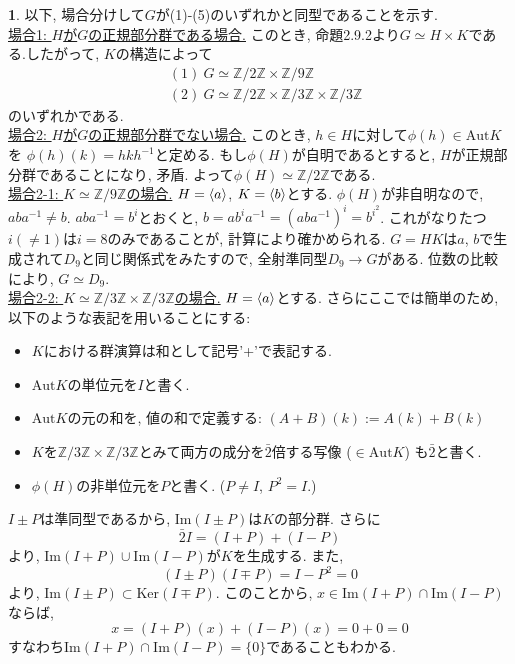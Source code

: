 \documentclass{article}
\theoremstyle{definition}
\newtheorem{ans}{}
\numberwithin{ans}{subsection}
\newcommand{\Z}[1]{\mathbb{Z}/#1\mathbb{Z}}
\newcommand{\Ker}[1]{\mathrm{Ker}(#1)}
\DeclarePairedDelimiter{\gen}{\langle}{\rangle}
\begin{document}
\begin{ans}
  以下, 場合分けして$G$が(1)-(5)のいずれかと同型であることを示す.\\

  \underline{場合1: $H$が$G$の正規部分群である場合.}
  このとき, 命題2.9.2より$G \simeq H \times K$である.したがって,
  $K$の構造によって
  \begin{align*}
    &(1)\ G \simeq \Z{2} \times \Z{9}\\
    &(2)\ G \simeq \Z{2} \times \Z{3} \times \Z{3}
  \end{align*}
  のいずれかである.\\

  \underline{場合2: $H$が$G$の正規部分群でない場合.}
  このとき, $h \in H$に対して$\phi(h) \in \mathrm{Aut}K$を
  $\phi(h)(k) = hkh^{-1}$と定める.
  もし$\phi(H)$が自明であるとすると, $H$が正規部分群であることになり, 矛盾.
  よって$\phi(H) \simeq \Z{2}$である.\\

  \underline{場合2-1: $K \simeq \Z{9}$の場合.}
  $H = \gen{a}$, $K = \gen{b}$とする.
  $\phi(H)$が非自明なので, $aba^{-1} \neq b$.
  $aba^{-1} = b^i$とおくと,
  $b = ab^ia^{-1} = (aba^{-1})^i = b^{i^2}$.
  これがなりたつ$i (\neq 1)$は$i = 8$のみであることが, 計算により確かめられる.
  $G = HK$は$a$, $b$で生成されて$D_9$と同じ関係式をみたすので,
  全射準同型$D_9 \rightarrow G$がある. 位数の比較により, $G \simeq D_9$.\\

  \underline{場合2-2: $K \simeq \Z{3} \times \Z{3}$の場合.}
  $H = \gen{a}$とする.
  さらにここでは簡単のため, 以下のような表記を用いることにする:
  \begin{itemize}
    \item $K$における群演算は和として記号'+'で表記する.
    \item $\mathrm{Aut}K$の単位元を$I$と書く.
    \item $\mathrm{Aut}K$の元の和を, 値の和で定義する: $(A + B)(k) := A(k) + B(k)$
    \item $K$を$\Z{3} \times \Z{3}$とみて両方の成分を$\bar{2}$倍する写像 ($\in \mathrm{Aut}K$) も$\bar{2}$と書く.
    \item $\phi(H)$の非単位元を$P$と書く. ($P \neq I$, $P^2 = I$.)
  \end{itemize}
  $I \pm P$は準同型であるから, $\mathrm{Im}(I \pm P)$は$K$の部分群.
  さらに
  \[
    \bar{2}I = (I + P) + (I - P)
  \]
  より, $\mathrm{Im}(I + P) \cup \mathrm{Im}(I - P)$が$K$を生成する.
  また,
  \[
    (I \pm P)(I \mp P) = I - P^2 = 0
  \]
  より, $\mathrm{Im}(I \pm P) \subset \Ker{I \mp P}$.
  このことから, $x \in \mathrm{Im}(I + P) \cap \mathrm{Im}(I - P)$ならば,
  \[
    x = (I + P)(x) + (I - P)(x) = 0 + 0 = 0
  \]
  すなわち$\mathrm{Im}(I + P) \cap \mathrm{Im}(I - P) = \{ 0 \}$であることもわかる.


\end{ans}
\end{document}

